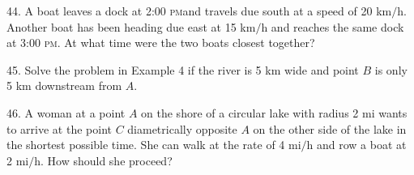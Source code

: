 \documentclass{sebase}
\begin{document}
\begin{multicols}{2}
\begin{ExerciseList}
%

\item[\hfill 44.] A boat leaves a dock at 2:00 \textsc{pm\thinspace }and
travels due south at a speed of 20 km$/$h. Another boat has been heading due
east at 15 km$/$h and reaches the same dock at 3:00 \textsc{pm}. At what
time were the two boats closest together?

%

\item[\hfill 45.] Solve the problem in Example 4 if the river is 5 km wide
and point $B$ is only 5 km downstream from $A$.

%

%
\enlargethispage{12pt}%

\item[\hfill 46.] A woman at a point $A$ on the shore of a circular lake
with radius 2 mi wants to arrive at the point $C$ diametrically opposite $A$
on the other side of the lake in the shortest possible time. She can walk at
the rate of 4 mi$/$h and row a boat at 2 mi$/$h. How should she proceed?\\[%
6pt]
\hspace*{\fill}\hspace*{\fill}


\end{ExerciseList}
\end{multicols}
\end{document}
